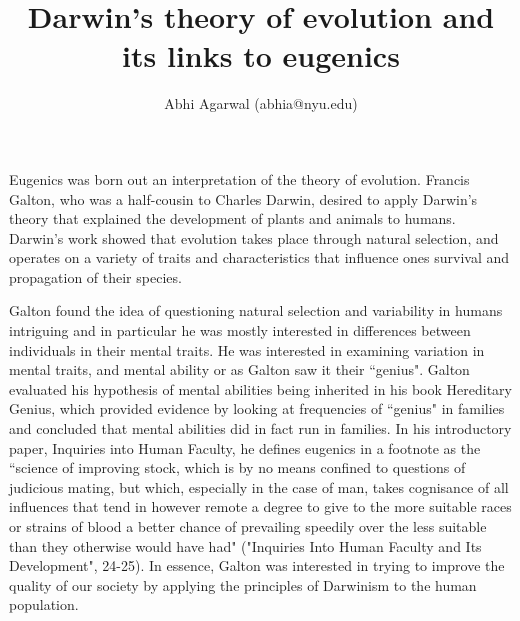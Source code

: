 \documentclass[11pt, oneside]{article}
\title{Darwin's theory of evolution and its links to eugenics}
\author{Abhi Agarwal (abhia@nyu.edu)}
\date{}
\begin{document}
\maketitle

\par 


\par 
Eugenics was born out an interpretation of the theory of evolution. Francis Galton, who was a half-cousin to Charles Darwin, desired to apply Darwin's theory that explained the development of plants and animals to humans. Darwin's work showed that evolution takes place through natural selection, and operates on a variety of traits and characteristics that influence ones survival and propagation of their species. 
\par Galton found the idea of questioning natural selection and variability in humans intriguing and in particular he was mostly interested in differences between individuals in their mental traits. He was interested in examining variation in mental traits, and mental ability or as Galton saw it their ``genius". Galton evaluated his hypothesis of mental abilities being inherited in his book Hereditary Genius, which provided evidence by looking at frequencies of ``genius" in families and concluded that mental abilities did in fact run in families. 
In his introductory paper, Inquiries into Human Faculty, he defines eugenics in a footnote as the ``science of improving stock, which is by no means confined to questions of judicious mating, but which, especially in the case of man, takes cognisance of all influences that tend in however remote a degree to give to the more suitable races or strains of blood a better chance of prevailing speedily over the less suitable than they otherwise would have had" ("Inquiries Into Human Faculty and Its Development", 24-25). In essence, Galton was interested in trying to improve the quality of our society by applying the principles of Darwinism to the human population. 
\end{document}
